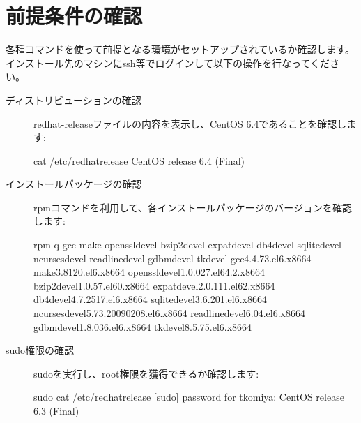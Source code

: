 \documentclass[letterpaper,10pt,dvipdfmx]{sphinxmanual}
\begin{document}
\section{前提条件の確認}
\label{\detokenize{procedure/precondition:id1}}\label{\detokenize{procedure/precondition::doc}}
各種コマンドを使って前提となる環境がセットアップされているか確認します。
インストール先のマシンにssh等でログインして以下の操作を行なってください。
\begin{description}
\item[{ディストリビューションの確認}] \leavevmode
redhat-releaseファイルの内容を表示し、CentOS 6.4であることを確認します:

%
\begin{sphinxVerbatim}[commandchars=\\\{\}]
\PYGZdl{} cat /etc/redhat\PYGZhy{}release
CentOS release 6.4 (Final)
\end{sphinxVerbatim}

\item[{インストールパッケージの確認}] \leavevmode
rpmコマンドを利用して、各インストールパッケージのバージョンを確認します:

%
\begin{sphinxVerbatim}[commandchars=\\\{\}]
\PYGZdl{} rpm \PYGZhy{}q gcc make openssl\PYGZhy{}devel bzip2\PYGZhy{}devel expat\PYGZhy{}devel db4\PYGZhy{}devel sqlite\PYGZhy{}devel ncurses\PYGZhy{}devel readline\PYGZhy{}devel gdbm\PYGZhy{}devel tk\PYGZhy{}devel
gcc\PYGZhy{}4.4.7\PYGZhy{}3.el6.x86\PYGZus{}64
make\PYGZhy{}3.81\PYGZhy{}20.el6.x86\PYGZus{}64
openssl\PYGZhy{}devel\PYGZhy{}1.0.0\PYGZhy{}27.el6\PYGZus{}4.2.x86\PYGZus{}64
bzip2\PYGZhy{}devel\PYGZhy{}1.0.5\PYGZhy{}7.el6\PYGZus{}0.x86\PYGZus{}64
expat\PYGZhy{}devel\PYGZhy{}2.0.1\PYGZhy{}11.el6\PYGZus{}2.x86\PYGZus{}64
db4\PYGZhy{}devel\PYGZhy{}4.7.25\PYGZhy{}17.el6.x86\PYGZus{}64
sqlite\PYGZhy{}devel\PYGZhy{}3.6.20\PYGZhy{}1.el6.x86\PYGZus{}64
ncurses\PYGZhy{}devel\PYGZhy{}5.7\PYGZhy{}3.20090208.el6.x86\PYGZus{}64
readline\PYGZhy{}devel\PYGZhy{}6.0\PYGZhy{}4.el6.x86\PYGZus{}64
gdbm\PYGZhy{}devel\PYGZhy{}1.8.0\PYGZhy{}36.el6.x86\PYGZus{}64
tk\PYGZhy{}devel\PYGZhy{}8.5.7\PYGZhy{}5.el6.x86\PYGZus{}64
\end{sphinxVerbatim}

\item[{sudo権限の確認}] \leavevmode
sudoを実行し、root権限を獲得できるか確認します:

%
\begin{sphinxVerbatim}[commandchars=\\\{\}]
\PYGZdl{} sudo cat /etc/redhat\PYGZhy{}release
[sudo] password for tkomiya:
CentOS release 6.3 (Final)
\end{sphinxVerbatim}


\end{description}
\end{document}

